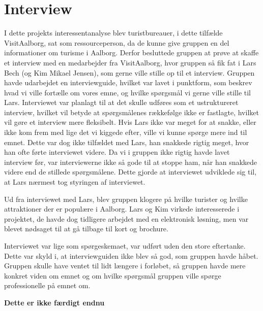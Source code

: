 \section{Interview}
I dette projekts interessentanalyse blev turistbureauer, i dette tilfælde VisitAalborg, sat som ressourceperson, da de kunne give gruppen en del informationer om turisme i Aalborg. Derfor besluttede gruppen at prøve at skaffe et interview med en medarbejder fra VisitAalborg, hvor gruppen så fik fat i Lars Bech (og Kim Mikael Jensen), som gerne ville stille op til et interview. Gruppen havde udarbejdet en interviewguide, hvilket var lavet i punktform, som beskrev hvad vi ville fortælle om vores emne, og hvilke spørgsmål vi gerne ville stille til Lars. Interviewet var planlagt til at det skulle udføres som et ustruktureret interview, hvilket vil betyde at spørgsmålenes rækkefølge ikke er fastlagte, hvilket vil gøre et interview mere fleksibelt. Hvis Lars ikke var meget for at snakke, eller ikke kom frem med lige det vi kiggede efter, ville vi kunne spørge mere ind til emnet. Dette var dog ikke tilfældet med Lars, han snakkede rigtig meget, hvor han ofte førte interviewet videre. Da vi i gruppen ikke rigtig havde lavet interview før, var interviewerne ikke så gode til at stoppe ham, når han snakkede videre end de stillede spørgsmålene. Dette gjorde at interviewet udviklede sig til, at Lars nærmest tog styringen af interviewet.

Ud fra interviewet med Lars, blev gruppen klogere på hvilke turister og hvilke attraktioner der er populære i Aalborg. Lars og Kim virkede interesserede i projektet, de havde dog tidligere arbejdet med en elektronisk løsning, men var blevet nødsaget til at gå tilbage til kort og brochure. 

Interviewet var lige som spørgeskemaet, var udført uden den store eftertanke. Dette var skyld i, at interviewguiden ikke blev så god, som gruppen havde håbet. Gruppen skulle have ventet til lidt længere i forløbet, så gruppen havde mere konkret viden om emnet og om hvilke spørgsmål gruppen ville spørge professionelle på emnet om. 

\textbf{Dette er ikke færdigt endnu} 
